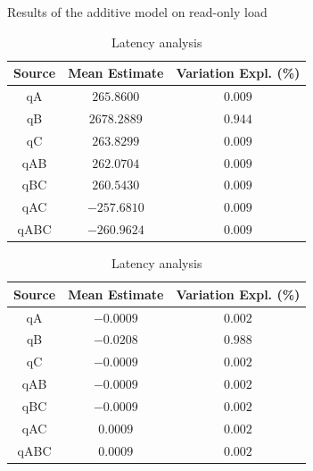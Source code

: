 \documentclass[11pt,a4paper]{article}
\begin{document}
\begin{table}[h]
\centering
\small
{Results of the additive model on read-only load}
\begin{minipage}{.5\textwidth}
\centering
	\begin{tabular}{|c|c|c|}
	\hline 
	{\small Source} & {\small Mean Estimate} & {\small Variation Expl. (\%)} \\ 
	\hline 
	qA & $265.8600$ & $0.009$ \\ 
	\hline 
	qB & $2678.2889$ & $0.944$ \\ 
	\hline 
	qC & $263.8299$ & $0.009$ \\ 
	\hline 
	qAB & $262.0704$ & $0.009$ \\ 
	\hline 
	qBC & $260.5430$ & $0.009$ \\ 
	\hline 
	qAC & $-257.6810$ & $0.009$ \\ 
	\hline 
	qABC & $-260.9624$ & $0.009$ \\ 
	\hline 
	\end{tabular} \caption{Throughput analysis} \label{tab:2k-add-ro-tpt}
\end{minipage}%
\begin{minipage}{.5\textwidth}
\centering
	\begin{tabular}{|c|c|c|}
	\hline 
	{\small Source} & {\small Mean Estimate} & {\small Variation Expl. (\%)} \\ 
	\hline 
	qA & $-0.0009$ & $0.002$ \\ 
	\hline 
	qB & $-0.0208$ & $0.988$ \\ 
	\hline 
	qC & $-0.0009$ & $0.002$ \\ 
	\hline 
	qAB & $-0.0009$ & $0.002$ \\ 
	\hline 
	qBC & $-0.0009$ & $0.002$ \\ 
	\hline 
	qAC & $0.0009$ & $0.002$ \\ 
	\hline 
	qABC & $0.0009$ & $0.002$ \\ 
	\hline 
	\end{tabular} \caption{Latency analysis} \label{tab:2k-add-ro-lat}
\end{minipage}
\end{table}\label{tab:2k-add-ro}
\\
\end{document}
